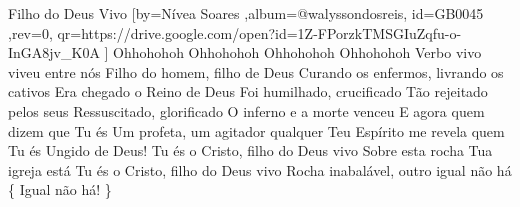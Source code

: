 \beginsong
{Filho do Deus Vivo %
}[by={Nívea Soares %
},album={@walyssondosreis},
id={GB0045 %
},rev={0}, %
qr={https://drive.google.com/open?id=1Z-FPorzkTMSGIuZqfu-o-InGA8jv_K0A %
}]
\beginverse* 
Ohhohohoh Ohhohohoh
Ohhohohoh Ohhohohoh
\endverse
\beginverse*
Verbo vivo viveu entre nós
Filho do homem, filho de Deus
Curando os enfermos, livrando os cativos
Era chegado o Reino de Deus
Foi humilhado, crucificado
Tão rejeitado pelos seus
Ressuscitado, glorificado
O inferno e a morte venceu
\endverse
\beginverse*
E agora quem dizem que Tu és
Um profeta, um agitador qualquer
Teu Espírito me revela quem Tu és
Ungido de Deus!
\endverse
\beginchorus
Tu és o Cristo, filho do Deus vivo
Sobre esta rocha Tua igreja está
Tu és o Cristo, filho do Deus vivo
Rocha inabalável, outro igual não há
\{ Igual não há! \}
\endchorus

